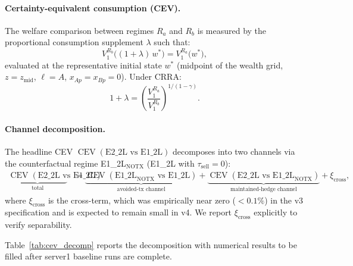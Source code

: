 \paragraph{Certainty-equivalent consumption (CEV).}
The welfare comparison between regimes $R_a$ and $R_b$ is measured by the
proportional consumption supplement $\lambda$ such that:
\begin{equation}
    V_1^{R_b}\!\bigl((1 + \lambda)\,w^{\ast}\bigr) = V_1^{R_a}\!\bigl(w^{\ast}\bigr),
    \label{eq:cev_def}
\end{equation}
evaluated at the representative initial state $w^{\ast}$ (midpoint of the
wealth grid, $z = z_{\text{mid}}$, $\ell = A$, $x_{Ap} = x_{Bp} = 0$).
Under CRRA:
\begin{equation}
    1 + \lambda = \left(\frac{V_1^{R_a}}{V_1^{R_b}}\right)^{\!\!1/(1-\gamma)}.
    \label{eq:cev_crra}
\end{equation}

\paragraph{Channel decomposition.}
The headline CEV $\operatorname{CEV}(\text{E2\_2L vs E1\_2L})$ decomposes into
two channels via the counterfactual regime E1\_2L$_{\text{NOTX}}$ (E1\_2L
with $\tau_{\text{sell}} = 0$):
\begin{align}
    \underbrace{\operatorname{CEV}(\text{E2\_2L vs E1\_2L})}_{\text{total}}
    &=
    \underbrace{\operatorname{CEV}(\text{E1\_2L}_{\text{NOTX}} \text{ vs E1\_2L})}_{\text{avoided-tx channel}}
    +
    \underbrace{\operatorname{CEV}(\text{E2\_2L vs E1\_2L}_{\text{NOTX}})}_{\text{maintained-hedge channel}}
    + \xi_{\text{cross}},
    \label{eq:decomp}
\end{align}
where $\xi_{\text{cross}}$ is the cross-term, which was empirically near zero
($< 0.1\%$) in the v3 specification and is expected to remain small in v4.
We report $\xi_{\text{cross}}$ explicitly to verify separability.

Table~\ref{tab:cev_decomp} reports the decomposition with numerical results
to be filled after server1 baseline runs are complete.


